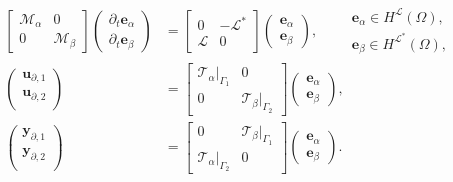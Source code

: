\documentclass[11pt,a4paper]{article}
\begin{document}
\begin{equation}\label{eq:co-energy-system}
    \begin{split}
    \begin{bmatrix}
        \mathcal{M}_\alpha & 0 \\
        0 & \mathcal{M}_\beta
    \end{bmatrix}
    \begin{pmatrix}
        \partial_t \bm{e}_{\alpha}\\
        \partial_t \bm{e}_{\beta}
    \end{pmatrix} &= 
    \begin{bmatrix}
        0 & -\mathcal{L}^* \\
        \mathcal{L} & 0
    \end{bmatrix}
    \begin{pmatrix}
        \bm{e}_\alpha \\
        \bm{e}_\beta
    \end{pmatrix},  \qquad 
    \begin{aligned}
        \bm{e}_\alpha \in H^\mathcal{L}(\Omega), \\
        \bm{e}_\beta \in H^\mathcal{L^*}(\Omega),
    \end{aligned}\\
    \begin{pmatrix}
    \bm{u}_{\partial, 1} \\
    \bm{u}_{\partial, 2} \\    
    \end{pmatrix}
     &= 
     \begin{bmatrix}
    \mathcal{T}_\alpha\vert_{\Gamma_1} & 0 \\
    0 & \mathcal{T}_\beta \vert_{\Gamma_2}
    \end{bmatrix}
    \begin{pmatrix}
        \bm{e}_\alpha \\
        \bm{e}_\beta
    \end{pmatrix}, \\
    \begin{pmatrix}
    \bm{y}_{\partial, 1} \\
    \bm{y}_{\partial, 2} \\    
    \end{pmatrix}
     &= 
     \begin{bmatrix}
    0 & \mathcal{T}_\beta\vert_{\Gamma_1} \\
    \mathcal{T}_\alpha \vert_{\Gamma_2} & 0
    \end{bmatrix}
    \begin{pmatrix}
        \bm{e}_\alpha \\
        \bm{e}_\beta
    \end{pmatrix}.
    \end{split}
\end{equation}
\end{document}

